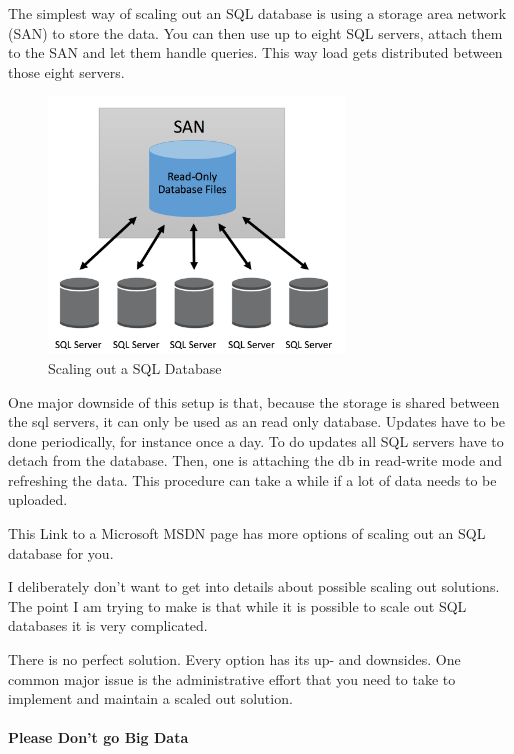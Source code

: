 \documentclass[12pt]{scrartcl} %
\begin{document}
The simplest way of scaling out an SQL database is using a storage area network (SAN) to store the data. You can then use up to eight SQL servers, attach them to the SAN and let them handle queries. This way load gets distributed between those eight servers.

\begin{figure}[htbp] 
  \centering
     \includegraphics[width=0.7\textwidth]{images/SQL-Scaling-Out}
  \caption{Scaling out a SQL Database}
  \label{fig:Bild1}
\end{figure}

One major downside of this setup is that, because the storage is shared between the sql servers, it can only be used as an read only database. Updates have to be done periodically, for instance once a day. To do updates all SQL servers have to detach from the database. Then, one is attaching the db in read-write mode and refreshing the data. This procedure can take a while if a lot of data needs to be uploaded.

This Link to a Microsoft MSDN page has more options of scaling out an SQL database for you.

I deliberately don’t want to get into details about possible scaling out solutions. The point I am trying to make is that while it is possible to scale out SQL databases it is very complicated.

There is no perfect solution. Every option has its up- and downsides. One common major issue is the administrative effort that you need to take to implement and maintain a scaled out solution.

\paragraph{Please Don’t go Big Data}
\end{document}
